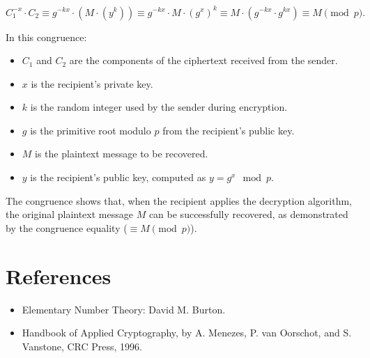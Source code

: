 \documentclass{article}
\begin{document}
\[
C_1^{-x} \cdot C_2 \equiv g^{-kx} \cdot (M \cdot (y^k)) \equiv g^{-kx} \cdot M \cdot (g^x)^k \equiv M \cdot (g^{-kx} \cdot g^{kx}) \equiv M \pmod{p}.
\]

In this congruence:

\begin{itemize}
    \item $C_1$ and $C_2$ are the components of the ciphertext received from the sender.
    \item $x$ is the recipient's private key.
    \item $k$ is the random integer used by the sender during encryption.
    \item $g$ is the primitive root modulo $p$ from the recipient's public key.
    \item $M$ is the plaintext message to be recovered.
    \item $y$ is the recipient's public key, computed as $y = g^x \mod p$.
\end{itemize}

The congruence shows that, when the recipient applies the decryption algorithm, the original plaintext message $M$ can be successfully recovered, as demonstrated by the congruence equality ($\equiv M \pmod{p}$).


\section*{References}

\begin{itemize}
    \item Elementary Number Theory: David M. Burton.
    \item Handbook of Applied Cryptography, by A. Menezes, P. van Oorschot, and S. Vanstone, CRC Press, 1996.
\end{itemize}
\end{document}
